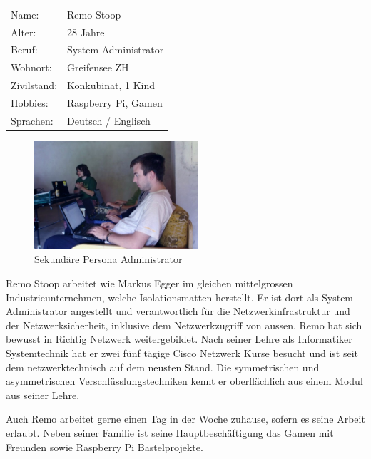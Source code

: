 \noindent\begin{minipage}[t]{0.5\textwidth}
\vspace{0pt}
    \begin{tabular}{ l l }
        Name: & Remo Stoop \\
        Alter: & 28 Jahre \\
        Beruf: & System Administrator \\
        Wohnort: & Greifensee ZH \\
        Zivilstand: & Konkubinat, 1 Kind \\
        Hobbies: & Raspberry Pi, Gamen \\
        Sprachen: & Deutsch / Englisch \\
    \end{tabular}
\end{minipage}
\hfill
\begin{minipage}[t]{0.5\textwidth}
\vspace{0pt}
\begin{figure}[H]
\centering
    \includegraphics[width=230px]{images/administrator.jpg}
    \caption[Sekundäre Persona Administrator]{Sekundäre Persona Administrator}
\end{figure}
\end{minipage}
\medskip

Remo Stoop arbeitet wie Markus Egger im gleichen mittelgrossen Industrieunternehmen, welche Isolationsmatten herstellt. Er ist dort als System Administrator angestellt und verantwortlich für die Netzwerkinfrastruktur und der Netzwerksicherheit, inklusive dem Netzwerkzugriff von aussen.  Remo hat sich bewusst in Richtig Netzwerk weitergebildet. Nach seiner Lehre als Informatiker Systemtechnik hat er zwei fünf tägige Cisco Netzwerk Kurse besucht und ist seit dem netzwerktechnisch auf dem neusten Stand. Die symmetrischen und asymmetrischen Verschlüsslungstechniken kennt er oberflächlich aus einem Modul aus seiner Lehre.

Auch Remo arbeitet gerne einen Tag in der Woche zuhause, sofern es seine Arbeit erlaubt. Neben seiner Familie ist seine Hauptbeschäftigung das Gamen mit Freunden sowie Raspberry Pi Bastelprojekte.



